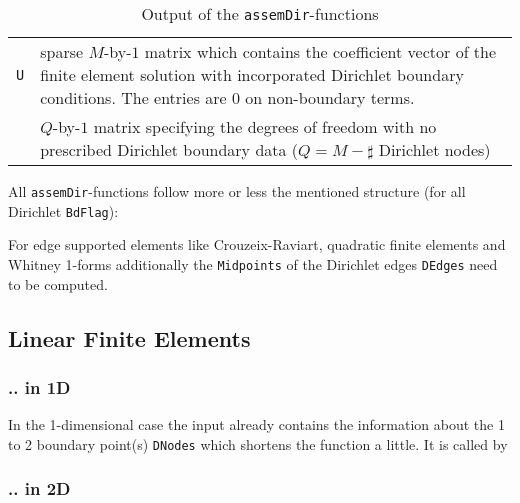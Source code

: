 \begin{table}[htb]
  \begin{tabular}{p{2cm}p{9cm}}
	{\tt U} & {\small sparse $M$-by-$1$ matrix which contains the coefficient vector of the finite element solution with incorporated Dirichlet boundary conditions. The entries are $0$ on non-boundary terms.} \\
    	\ttitindex{FreeDofs} & {\small $Q$-by-$1$ matrix specifying the degrees of freedom with no prescribed Dirichlet boundary data ($Q = M - \sharp$ Dirichlet nodes)}
  \end{tabular}
  \caption{Output of the {\tt assemDir}-functions}
  \label{tab:bound_out}
\end{table}


 All {\tt assemDir}-functions follow more or less the mentioned structure (for all Dirichlet {\tt BdFlag}):


 For edge supported elements like Crouzeix-Raviart, quadratic finite elements and Whitney 1-forms additionally the {\tt Midpoints} of the Dirichlet edges {\tt DEdges} need to be computed.



\subsection{Linear Finite Elements} 

\subsubsection{.. in 1D}

 In the 1-dimensional case the input already contains the information about the 1 to 2 boundary point(s) {\tt DNodes} which shortens the function  a little. It is called by \\



\subsubsection{.. in 2D} 

